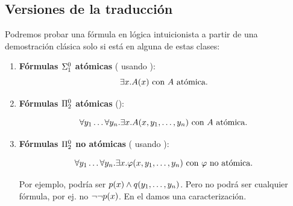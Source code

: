 \subsection{Versiones de la traducción}

Podremos probar una fórmula en lógica intuicionista a partir de una demostración clásica solo si está en alguna de estas clases:

\begin{enumerate}
    \item \textbf{Fórmulas $\Sigma^0_{1}$ atómicas} ( usando ):
          \[
              \exists x . A(x) \text{ con } A \text{ atómica.}
          \]
    \item \textbf{Fórmulas $\Pi^0_{2}$ atómicas} ():

          \[
              \forall y_1 \dots \forall y_n . \exists x . A(x, y_1, \dots, y_n) \text{ con } A \text{ atómica}.
          \]

    \item \textbf{Fórmulas $\Pi^0_{2}$ no atómicas} ( usando ):

          \[
              \forall y_1 \dots \forall y_n . \exists x . \varphi(x, y_1, \dots, y_n) \text{ con } \varphi \text{ no atómica}.
          \]

          Por ejemplo, podría ser $p(x) \wedge q(y_1, \dots, y_n)$.
          Pero no podrá ser cualquier fórmula, por ej. no $\neg \neg p(x)$. En el  damos una caracterización.
\end{enumerate}


